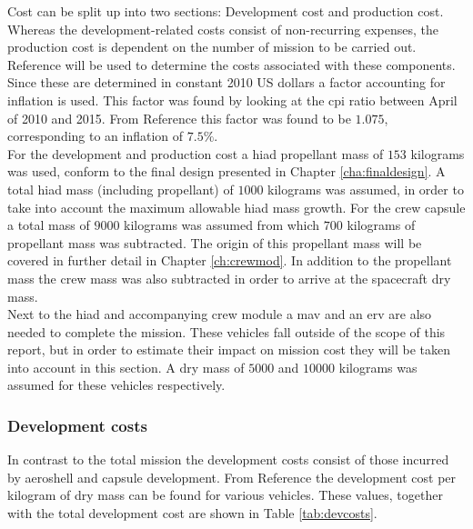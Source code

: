 Cost can be split up into two sections: Development cost and production cost. Whereas the development-related costs consist of non-recurring expenses, the production cost is dependent on the number of mission to be carried out. Reference \cite{Wertz2011} will be used to determine the costs associated with these components. Since these are determined in constant 2010 US dollars a factor accounting for inflation is used. This factor was found by looking at the \gls{cpi} ratio between April of 2010 and 2015. From Reference \cite{Crawford2015} this factor was found to be $1.075$, corresponding to an inflation of $7.5\%$.\\
For the development and production cost a \gls{hiad} propellant mass of $153$ kilograms was used, conform to the final design presented in Chapter \ref{cha:finaldesign}. A total \gls{hiad} mass (including propellant) of $1000$ kilograms was assumed, in order to take into account the maximum allowable \gls{hiad} mass growth. For the crew capsule a total mass of $9000$ kilograms was assumed from which $700$ kilograms of propellant mass was subtracted. The origin of this propellant mass will be covered in further detail in Chapter \ref{ch:crewmod}. In addition to the propellant mass the crew mass was also subtracted in order to arrive at the spacecraft dry mass.\\
Next to the \gls{hiad} and accompanying crew module a \acrlong{mav} and an \acrlong{erv} are also needed to complete the mission. These vehicles fall outside of the scope of this report, but in order to estimate their impact on mission cost they will be taken into account in this section. A dry mass of $5000$ and $10000$ kilograms was assumed for these vehicles respectively.

\subsubsection{Development costs}
In contrast to the total mission the development costs consist of those incurred by aeroshell and capsule development. From Reference \cite{Wertz2011} the development cost per kilogram of dry mass can be found for various vehicles. These values, together with the total development cost are shown in Table \ref{tab:devcosts}.

